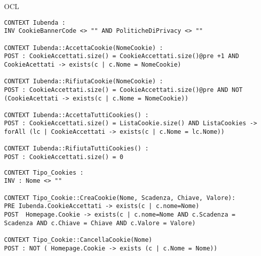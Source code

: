 \begin{listaPersonale}{OCL}
    \begin{lstlisting}
CONTEXT Iubenda :
INV CookieBannerCode <> "" AND PoliticheDiPrivacy <> ""

CONTEXT Iubenda::AccettaCookie(NomeCookie) :
POST : CookieAccettati.size() = CookieAccettati.size()@pre +1 AND CookieAcettati -> exists(c | c.Nome = NomeCookie)

CONTEXT Iubenda::RifiutaCookie(NomeCookie) :
POST : CookieAccettati.size() = CookieAccettati.size()@pre AND NOT (CookieAcettati -> exists(c | c.Nome = NomeCookie))

CONTEXT Iubenda::AccettaTuttiCookies() :
POST : CookieAccettati.size() = ListaCookie.size() AND ListaCookies -> forAll (lc | CookieAccettati -> exists(c | c.Nome = lc.Nome))

CONTEXT Iubenda::RifiutaTuttiCookies() :
POST : CookieAccettati.size() = 0
    \end{lstlisting}




    \begin{lstlisting}
CONTEXT Tipo_Cookies :
INV : Nome <> "" 

CONTEXT Tipo_Cookie::CreaCookie(Nome, Scadenza, Chiave, Valore):
PRE Iubenda.CookieAccettati -> exists(c | c.nome=Nome)
POST  Homepage.Cookie -> exists(c | c.nome=Nome AND c.Scadenza =  Scadenza AND c.Chiave = Chiave AND c.Valore = Valore) 

CONTEXT Tipo_Cookie::CancellaCookie(Nome)
POST : NOT ( Homepage.Cookie -> exists (c | c.Nome = Nome))
    \end{lstlisting}


\end{listaPersonale}
